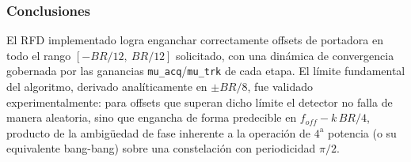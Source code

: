 \subsubsection*{Conclusiones}
El RFD implementado logra enganchar correctamente offsets de portadora en
todo el rango $[-BR/12,\ BR/12]$ solicitado, con una dinámica de convergencia
gobernada por las ganancias \texttt{mu\_acq}/\texttt{mu\_trk} de cada etapa.
El límite fundamental del algoritmo, derivado analíticamente en
$\pm BR/8$, fue validado experimentalmente: para offsets que superan dicho
límite el detector no falla de manera aleatoria, sino que engancha de forma
predecible en $f_{off}-k\,BR/4$, producto de la ambigüedad de fase inherente
a la operación de $4^{\text{a}}$ potencia (o su equivalente bang-bang) sobre
una constelación con periodicidad $\pi/2$.